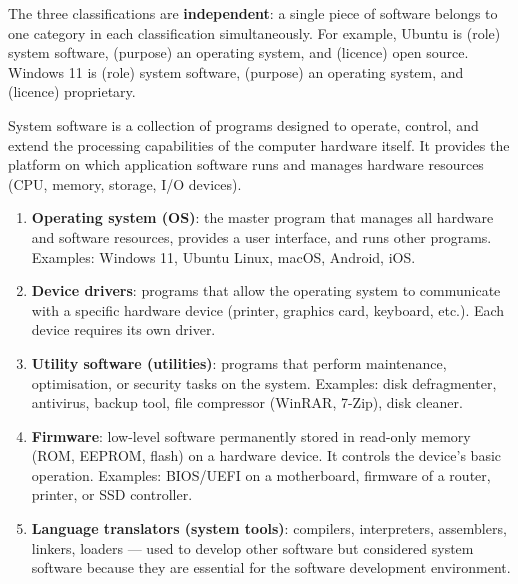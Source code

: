 \documentclass[11pt]{article}
\newcounter{popsec}
\newcounter{popsub}
\newcommand{\courssub}[1]{%
  \stepcounter{popsub}%
  \par\vspace{9pt}\noindent{\popxbold\fontsize{11.5}{13}\selectfont\color{popink}{\color{poporange}\thepopsec.\thepopsub}\hspace{6pt}#1}\par\nopagebreak\vspace{4pt}
}
\begin{document}
\begin{aretenir}
The three classifications are \textbf{independent}: a single piece of software belongs to one category in each classification simultaneously. For example, Ubuntu is (role) system software, (purpose) an operating system, and (licence) open source. Windows 11 is (role) system software, (purpose) an operating system, and (licence) proprietary.
\end{aretenir}

\courssub{System software}

\begin{definition}
System software is a collection of programs designed to operate, control, and extend the processing capabilities of the computer hardware itself. It provides the platform on which application software runs and manages hardware resources (CPU, memory, storage, I/O devices).
\end{definition}

\begin{propriete}
\begin{enumerate}
\item \textbf{Operating system (OS)}: the master program that manages all hardware and software resources, provides a user interface, and runs other programs. Examples: Windows 11, Ubuntu Linux, macOS, Android, iOS.
\item \textbf{Device drivers}: programs that allow the operating system to communicate with a specific hardware device (printer, graphics card, keyboard, etc.). Each device requires its own driver.
\item \textbf{Utility software (utilities)}: programs that perform maintenance, optimisation, or security tasks on the system. Examples: disk defragmenter, antivirus, backup tool, file compressor (WinRAR, 7-Zip), disk cleaner.
\item \textbf{Firmware}: low-level software permanently stored in read-only memory (ROM, EEPROM, flash) on a hardware device. It controls the device's basic operation. Examples: BIOS/UEFI on a motherboard, firmware of a router, printer, or SSD controller.
\item \textbf{Language translators (system tools)}: compilers, interpreters, assemblers, linkers, loaders — used to develop other software but considered system software because they are essential for the software development environment.
\end{enumerate}
\end{propriete}
\end{document}
